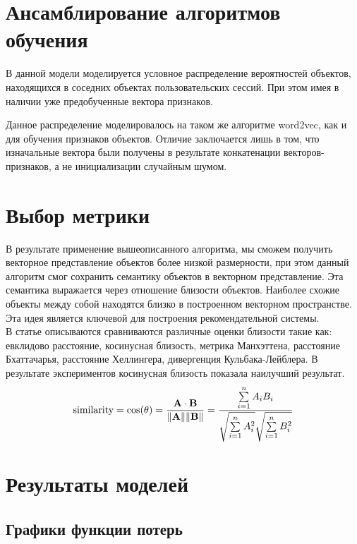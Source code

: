 \section{Ансамблирование алгоритмов обучения} \label{ch4:sec4}

В данной модели моделируется условное распределение вероятностей объектов, находящихся в соседних объектах пользовательских сессий.
При этом имея в наличии уже предобученные вектора признаков.

Данное распределение моделировалось на таком же алгоритме word2vec, как и для обучения признаков объектов.
Отличие заключается лишь в том, что изначальные вектора были получены в результате конкатенации векторов-признаков, а не инициализации случайным шумом.

\section{Выбор метрики} \label{ch4:sec5}
В результате применение вышеописанного алгоритма, мы сможем получить векторное представление объектов более низкой размерности,
 при этом данный алгоритм смог сохранить семантику объектов в векторном представление.
  Эта семантика выражается через отношение близости объектов. Наиболее схожие объекты между собой находятся близко в построенном векторном пространстве.
   Эта идея является ключевой для построения рекомендательной системы. \\
В статье  \cite{dist} описываются сравниваются различные оценки близости такие как: евклидово расстояние, косинусная близость, метрика Манхэттена, расстояние Бхаттачарья, расстояние Хеллингера, дивергенция Кульбака-Лейблера. В результате экспериментов косинусная близость показала наилучший результат. \\
 
\[
\displaystyle {\text{similarity}}=\cos(\theta )={\mathbf {A} \cdot \mathbf {B}  \over \|\mathbf {A} \|\|\mathbf {B} \|}={\frac {\sum \limits _{i=1}^{n}{A_{i}B_{i}}}{{\sqrt {\sum \limits _{i=1}^{n}{A_{i}^{2}}}}{\sqrt {\sum \limits _{i=1}^{n}{B_{i}^{2}}}}}}
\]

\section{Результаты моделей} \label{ch4:sec6}

\subsection{Графики функции потерь} \label{ch4:sec6:sec1}

